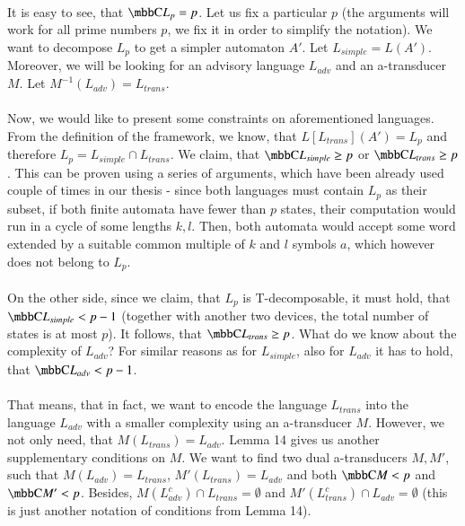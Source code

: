 \paragraph{}
It is easy to see, that $\C{L_p} = p$. Let us fix a particular $p$ (the arguments will work for all prime numbers $p$, we fix it in order to simplify the notation). We want to decompose $L_p$ to get a simpler automaton $A'$. Let $L_{simple} = L(A')$. Moreover, we will be looking for an advisory language $L_{adv}$ and an a-transducer $M$. Let $M^{-1}(L_{adv}) = L_{trans}$.

\paragraph{}
Now, we would like to present some constraints on aforementioned languages. From the definition of the framework, we know, that $L[L_{trans}](A') = L_p$ and therefore $L_p = L_{simple} \cap L_{trans}$. We claim, that $\C{L_{simple}} \geq p$ or $\C{L_{trans}} \geq p$. This can be proven using a series of arguments, which have been already used couple of times in our thesis - since both languages must contain $L_p$ as their subset, if both finite automata have fewer than $p$ states, their computation would run in a cycle of some lengths $k, l$. Then, both automata would accept some word extended by a suitable common multiple of $k$ and $l$ symbols $a$, which however does not belong to $L_p$.

\paragraph{}
On the other side, since we claim, that $L_p$ is T-decomposable, it must hold, that $\C{L_{simple}} \allowbreak < p-1$ (together with another two devices, the total number of states is at most $p$). It follows, that $\C{L_{trans}} \geq p$. What do we know about the complexity of $L_{adv}$? For similar reasons as for $L_{simple}$, also for $L_{adv}$ it has to hold, that $\C{L_{adv}} < p-1$.

\paragraph{}
That means, that in fact, we want to encode the language $L_{trans}$ into the language $L_{adv}$ with a smaller complexity using an a-transducer $M$. However, we not only need, that $M(L_{trans}) = L_{adv}$. Lemma 14 gives us another supplementary conditions on $M$. We want to find two dual a-transducers $M, M'$, such that $M(L_{adv}) = L_{trans}$, $M'(L_{trans}) = L_{adv}$ and both $\C{M} < p$ and $\C{M'} < p$. Besides, $M(L^c_{adv}) \cap L_{trans} = \emptyset$ and $M'(L^c_{trans}) \cap L_{adv} = \emptyset$ (this is just another notation of conditions from Lemma 14).

